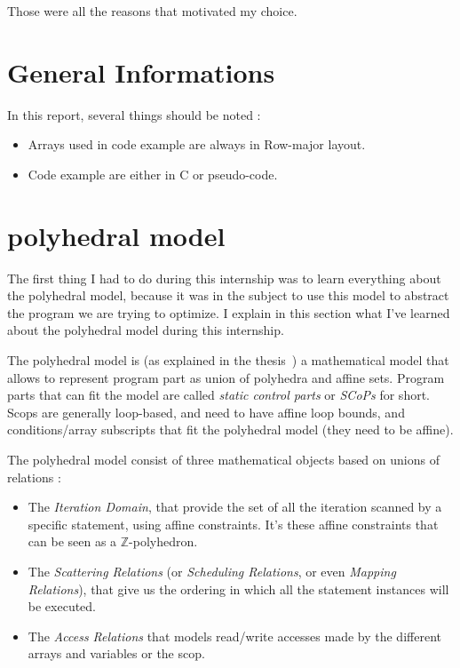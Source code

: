 \documentclass[paper=a4, fontsize=11.5pt]{scrartcl}
\numberwithin{equation}{section}        %
\numberwithin{figure}{section}          %
\numberwithin{table}{section}               %
\begin{document}
\bigskip

Those were all the reasons that motivated my choice.


\section{General Informations}

    In this report, several things should be noted :
    \begin{itemize}
        \item Arrays used in code example are always in Row-major layout.
        \item Code example are either in C or pseudo-code.
    \end{itemize}

\section{polyhedral model}
The first thing I had to do during this internship was to learn everything about the polyhedral
model, because it was in the subject to use this model to abstract the program we are trying
to optimize. I explain in this section what I've learned about the polyhedral model during
this internship.

\bigskip

The polyhedral model is (as explained in the thesis~\cite{Bas'12}) a mathematical
model that allows to represent program part as union of polyhedra and affine sets.
Program parts that can fit the model are called \textit{static control parts} or
\textit{SCoPs} for short. Scops are generally loop-based, and need to have affine loop bounds,
and conditions/array subscripts that fit the polyhedral model (they need to be affine).

The polyhedral model consist of three mathematical objects based on unions of relations :
\begin{itemize}
    \item The \textit{Iteration Domain}, that provide the set of all the iteration scanned
        by a specific statement, using affine constraints. It's these affine constraints 
        that can be seen as a $\mathbb{Z}$-polyhedron.
    \item The \textit{Scattering Relations} (or \textit{Scheduling Relations},
        or even \textit{Mapping Relations}), that give us the ordering in which
        all the statement instances will be executed.
    \item The \textit{Access Relations} that models read/write accesses made by
        the different arrays and variables or the scop.
\end{itemize}
\end{document}
